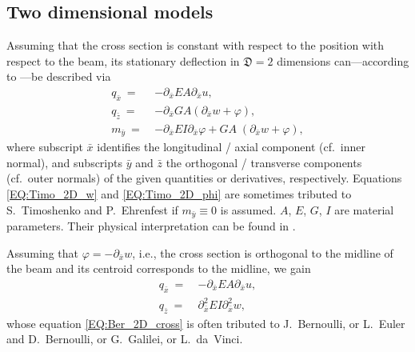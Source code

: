 \documentclass[a4paper, english, 12pt, reqno, draft]{amsart}
\theoremstyle{definition}
\theoremstyle{remark}
\numberwithin{equation}{section}
\newcommand{\globDim}{\ensuremath{\mathfrak D}}
\newcommand{\longDef}{\ensuremath{u}}
\newcommand{\crossDef}{\ensuremath{w}}
\newcommand{\torsion}{\ensuremath{\varphi}}
\newcommand{\force}{\ensuremath{q}}
\newcommand{\momentum}{\ensuremath{m}}
\begin{document}
\subsection{Two dimensional models}\label{SEC:2d_Ber}
% 
Assuming that the cross section is constant with respect to the position with respect to the beam, its stationary deflection in $\globDim = 2$ dimensions can---according to \cite[Sect.~1.4.3]{MeskourisH2013}---be described via
% 
\begin{subequations}\label{EQ:Timo_2D}
 \begin{align}
  \force_{\bar x} ~=~ & - \partial_{\bar x} EA \partial_{\bar x} \longDef, \label{EQ:beam_long_Timo}\\
  \force_{\bar z} ~=~ & - \partial_{\bar x} GA ( \partial_{\bar x} \crossDef + \torsion ), \label{EQ:Timo_2D_w}\\
  \momentum_{\bar y} ~=~ & - \partial_{\bar x} EI \partial_{\bar x} \torsion + GA \; ( \partial_{\bar x} \crossDef + \torsion ), \label{EQ:Timo_2D_phi}
 \end{align}
\end{subequations}
% 
where subscript $\bar x$ identifies the longitudinal / axial component (cf.~inner normal), and subscripts $\bar y$ and $\bar z$ the orthogonal / transverse components (cf.~outer normals) of the given quantities or derivatives, respectively. Equations  \eqref{EQ:Timo_2D_w} and \eqref{EQ:Timo_2D_phi} are sometimes tributed to S.~Timoshenko and P.~Ehrenfest if $\momentum_{\bar y} \equiv 0$ is assumed. $A$, $E$, $G$, $I$ are material parameters. Their physical interpretation can be found in \cite[Sect.~1.3.3]{MeskourisH2013}.

Assuming that $\torsion = - \partial_{\bar x} \crossDef$, i.e., the cross section is orthogonal to the midline of the beam and its centroid corresponds to the midline, we gain
% 
\begin{subequations}\label{EQ:Ber_2D}
 \begin{align}
  \force_{\bar x} ~=~ & - \partial_{\bar x}  EA \partial_{\bar x} \longDef, \label{EQ:beam_long_Ber}\\
  \force_{\bar z} ~=~ & \partial_{\bar x}^2 EI \partial_{\bar x}^2 \crossDef, \label{EQ:Ber_2D_cross}
 \end{align}
\end{subequations}
% 
whose equation \eqref{EQ:Ber_2D_cross} is often tributed to J.~Bernoulli, or  L.~Euler and D.~Bernoulli, or G.~Galilei, or L.~da~Vinci.
% 
\end{document}
